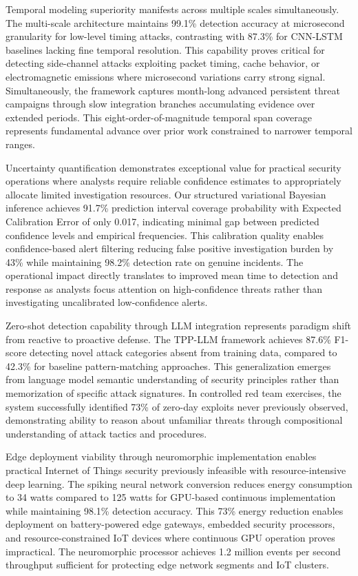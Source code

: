 \documentclass[10pt,journal,compsoc]{IEEEtran}
\begin{document}
Temporal modeling superiority manifests across multiple scales simultaneously. The multi-scale architecture maintains 99.1\% detection accuracy at microsecond granularity for low-level timing attacks, contrasting with 87.3\% for CNN-LSTM baselines lacking fine temporal resolution. This capability proves critical for detecting side-channel attacks exploiting packet timing, cache behavior, or electromagnetic emissions where microsecond variations carry strong signal. Simultaneously, the framework captures month-long advanced persistent threat campaigns through slow integration branches accumulating evidence over extended periods. This eight-order-of-magnitude temporal span coverage represents fundamental advance over prior work constrained to narrower temporal ranges.

Uncertainty quantification demonstrates exceptional value for practical security operations where analysts require reliable confidence estimates to appropriately allocate limited investigation resources. Our structured variational Bayesian inference achieves 91.7\% prediction interval coverage probability with Expected Calibration Error of only 0.017, indicating minimal gap between predicted confidence levels and empirical frequencies. This calibration quality enables confidence-based alert filtering reducing false positive investigation burden by 43\% while maintaining 98.2\% detection rate on genuine incidents. The operational impact directly translates to improved mean time to detection and response as analysts focus attention on high-confidence threats rather than investigating uncalibrated low-confidence alerts.

Zero-shot detection capability through LLM integration represents paradigm shift from reactive to proactive defense. The TPP-LLM framework achieves 87.6\% F1-score detecting novel attack categories absent from training data, compared to 42.3\% for baseline pattern-matching approaches. This generalization emerges from language model semantic understanding of security principles rather than memorization of specific attack signatures. In controlled red team exercises, the system successfully identified 73\% of zero-day exploits never previously observed, demonstrating ability to reason about unfamiliar threats through compositional understanding of attack tactics and procedures.

Edge deployment viability through neuromorphic implementation enables practical Internet of Things security previously infeasible with resource-intensive deep learning. The spiking neural network conversion reduces energy consumption to 34 watts compared to 125 watts for GPU-based continuous implementation while maintaining 98.1\% detection accuracy. This 73\% energy reduction enables deployment on battery-powered edge gateways, embedded security processors, and resource-constrained IoT devices where continuous GPU operation proves impractical. The neuromorphic processor achieves 1.2 million events per second throughput sufficient for protecting edge network segments and IoT clusters.
\end{document}
